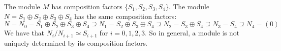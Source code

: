 \begin{note}
The module $M$ has composition factors $\{S_1,S_2,S_3,S_4\}$. The
module $N = S_1\oplus S_2\oplus S_3\oplus S_4$ has the same
composition factors:
\[N = N_0 = S_1\oplus S_2\oplus S_3\oplus S_4 \supseteq N_1 = S_2\oplus
  S_3\oplus S_4 \supseteq N_2 = S_3\oplus S_4 \supseteq N_3 = S_4
  \supseteq N_4 = (0)\]
We have that $N_i/N_{i+1} \simeq S_{i+1}$ for $i = 0,1,2,3$.  So in
general, a module is not uniquely determined by its composition factors.
\end{note}